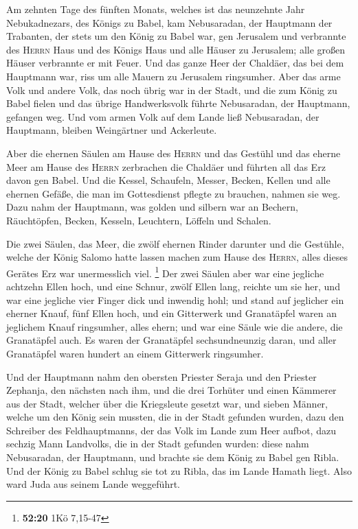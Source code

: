  Am zehnten Tage des fünften Monats, welches ist das
neunzehnte Jahr Nebukadnezars, des Königs zu Babel, kam Nebusaradan, der
Hauptmann der Trabanten, der stets um den König zu Babel war, gen
Jerusalem  und verbrannte des \textsc{Herrn} Haus und des
Königs Haus und alle Häuser zu Jerusalem; alle großen Häuser verbrannte
er mit Feuer.  Und das ganze Heer der Chaldäer, das bei
dem Hauptmann war, riss um alle Mauern zu Jerusalem ringsumher.
 Aber das arme Volk und andere Volk, das noch übrig war
in der Stadt, und die zum König zu Babel fielen und das übrige
Handwerksvolk führte Nebusaradan, der Hauptmann, gefangen weg.
 Und vom armen Volk auf dem Lande ließ Nebusaradan, der
Hauptmann, bleiben Weingärtner und Ackerleute.

 Aber die ehernen Säulen am Hause des \textsc{Herrn} und
das Gestühl und das eherne Meer am Hause des \textsc{Herrn} zerbrachen
die Chaldäer und führten all das Erz davon gen Babel. 
Und die Kessel, Schaufeln, Messer, Becken, Kellen und alle ehernen
Gefäße, die man im Gottesdienst pflegte zu brauchen, nahmen sie weg.
 Dazu nahm der Hauptmann, was golden und silbern war an
Bechern, Räuchtöpfen, Becken, Kesseln, Leuchtern, Löffeln und Schalen.

 Die zwei Säulen, das Meer, die zwölf ehernen Rinder
darunter und die Gestühle, welche der König Salomo hatte lassen machen
zum Hause des \textsc{Herrn}, alles dieses Gerätes Erz war unermesslich
viel. \footnote{\textbf{52:20} 1Kö 7,15-47}  Der zwei
Säulen aber war eine jegliche achtzehn Ellen hoch, und eine Schnur,
zwölf Ellen lang, reichte um sie her, und war eine jegliche vier Finger
dick und inwendig hohl;  und stand auf jeglicher ein
eherner Knauf, fünf Ellen hoch, und ein Gitterwerk und Granatäpfel waren
an jeglichem Knauf ringsumher, alles ehern; und war eine Säule wie die
andere, die Granatäpfel auch.  Es waren der Granatäpfel
sechsundneunzig daran, und aller Granatäpfel waren hundert an einem
Gitterwerk ringsumher.

 Und der Hauptmann nahm den obersten Priester Seraja und
den Priester Zephanja, den nächsten nach ihm, und die drei Torhüter
 und einen Kämmerer aus der Stadt, welcher über die
Kriegsleute gesetzt war, und sieben Männer, welche um den König sein
mussten, die in der Stadt gefunden wurden, dazu den Schreiber des
Feldhauptmanns, der das Volk im Lande zum Heer aufbot, dazu sechzig Mann
Landvolks, die in der Stadt gefunden wurden:  diese nahm
Nebusaradan, der Hauptmann, und brachte sie dem König zu Babel gen
Ribla.  Und der König zu Babel schlug sie tot zu Ribla,
das im Lande Hamath liegt. Also ward Juda aus seinem Lande weggeführt.

